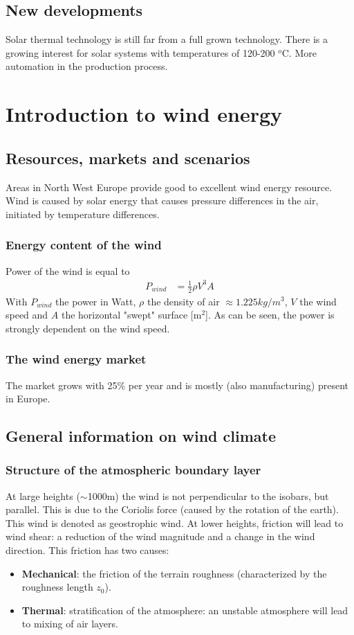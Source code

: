 \documentclass[a4paper,10pt]{article}
\begin{document}
\subsection{New developments}
Solar thermal technology is still far from a full grown technology. There is a growing interest for solar systems with temperatures of 120-200 $^o$C. More automation in the production process.


\section{Introduction to wind energy}
\subsection{Resources, markets and scenarios}
Areas in North West Europe provide good to excellent wind energy resource. Wind is caused by solar energy that causes pressure differences in the air, initiated by temperature differences.

\subsubsection{Energy content of the wind}
Power of the wind is equal to
\begin{align}
 P_{wind} &= \frac{1}{2} \rho V^3 A
\end{align}
With $P_{wind}$ the power in Watt, $\rho$ the density of air $\approx 1.225 kg/m^3$, $V$ the wind speed and $A$ the horizontal "swept" surface [m$^2$]. As can be seen, the power is strongly dependent on the wind speed.

\subsubsection{The wind energy market}
The market grows with 25\% per year and is mostly (also manufacturing) present in Europe.

\subsection{General information on wind climate}
\subsubsection{Structure of the atmospheric boundary layer}
At large heights ($\sim$1000m) the wind is not perpendicular to the isobars, but parallel. This is due to the Coriolis force (caused by the rotation of the earth). This wind is denoted as geostrophic wind. At lower heights, friction will lead to wind shear: a reduction of the wind magnitude and a change in the wind direction. This friction has two causes:
\begin{itemize}
 \item \textbf{Mechanical}: the friction of the terrain roughness (characterized by the roughness length $z_0$).
 \item \textbf{Thermal}: stratification of the atmosphere: an unstable atmosphere will lead to mixing of air layers.
\end{itemize}
\end{document}
